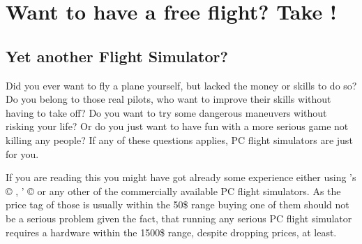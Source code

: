 
\chapter{Want to have a free flight? Take {\FlightGear}!\label{free}}

\section{Yet another Flight Simulator?}

Did you ever want to fly a plane yourself, but lacked the money or
skills to do so? Do you belong to those real pilots, who want to
improve their skills without having to take off? Do you want to
try some dangerous maneuvers without risking your life? Or do you
just want to have fun with a more serious game not killing any
people? If any of these questions applies, PC flight simulators
are just for you.

If you are reading this you might have got already some experience either using
's {\copyright} , ' {\copyright}
 or any other of the commercially available PC flight
simulators. As the price tag of those is usually within the 50\$ range buying one of them
should not be a serious problem given the fact, that running any serious PC flight
simulator requires a hardware within the 1500\$ range, despite dropping prices, at least.

